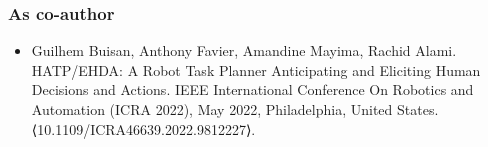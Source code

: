 \subsubsection*{As co-author}
\begin{itemize}

    
    \item Guilhem Buisan, Anthony Favier, Amandine Mayima, Rachid Alami. HATP/EHDA: A Robot Task Planner Anticipating and Eliciting Human Decisions and Actions. IEEE International Conference On Robotics and Automation (ICRA 2022), May 2022, Philadelphia, United States. ⟨10.1109/ICRA46639.2022.9812227⟩. 
    

\end{itemize}
